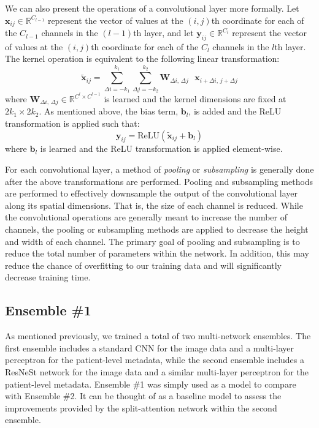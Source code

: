 \documentclass [MAS] {uclathes}
\begin{document}
We can also present the operations of a convolutional layer more formally. Let $\mathbf{x}_{i j} \in \mathbb{R}^{C_{l-1}}$ represent the vector of values at the $(i, j)$th coordinate for each of the $C_{l-1}$ channels in the $(l-1)$th layer, and let $\mathbf{y}_{i j} \in \mathbb{R}^{C_{l}}$ represent the vector of values at the $(i, j)$th coordinate for each of the $C_{l}$ channels in the $l$th layer. The kernel operation is equivalent to the following linear transformation: $$\tilde{\mathbf{x}}_{i j} = \sum_{\Delta i = -k_1}^{k_1} \sum_{\Delta j = -k_2}^{k_2} \mathbf{W}_{\Delta i \text{, } \Delta j} \text{ } \mathbf{x}_{i+\Delta i \text{, } j+\Delta j}$$ where $\mathbf{W}_{\Delta i \text{, } \Delta j} \in \mathbb{R}^{C^{l} \times C^{l-1}}$ is learned and the kernel dimensions are fixed at $2k_1 \times 2k_2$. As mentioned above, the bias term, $\mathbf{b}_{l}$, is added and the ReLU transformation is applied such that: $$\mathbf{y}_{i j} = \text{ReLU}(\tilde{\mathbf{x}}_{i j} + \mathbf{b}_{l})$$ where $\mathbf{b}_{l}$ is learned and the ReLU transformation is applied element-wise.

For each convolutional layer, a method of \textit{pooling} or \textit{subsampling} is generally done after the above transformations are performed. Pooling and subsampling methods are performed to effectively downsample the output of the convolutional layer along its spatial dimensions. That is, the size of each channel is reduced. While the convolutional operations are generally meant to increase the number of channels, the pooling or subsampling methods are applied to decrease the height and width of each channel. The primary goal of pooling and subsampling is to reduce the total number of parameters within the network. In addition, this may reduce the chance of overfitting to our training data and will significantly decrease training time.

\subsection{Ensemble \#1}

As mentioned previously, we trained a total of two multi-network ensembles. The first ensemble includes a standard CNN for the image data and a multi-layer perceptron for the patient-level metadata, while the second ensemble includes a ResNeSt network for the image data and a similar multi-layer perceptron for the patient-level metadata. Ensemble \#1 was simply used as a model to compare with Ensemble \#2. It can be thought of as a baseline model to assess the improvements provided by the split-attention network within the second ensemble. 
\end{document}
